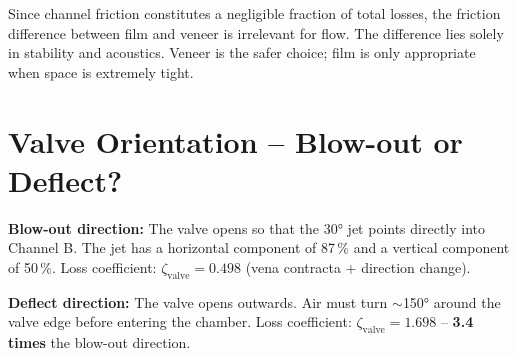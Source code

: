 \documentclass[11pt,a4paper]{article}
\begin{document}
\begin{table}[H]
\centering\small
{}
\caption{Film vs.\ veneer as dividing wall material}
\end{table}

Since channel friction constitutes a negligible fraction of total losses, the friction difference between film and veneer is irrelevant for flow. The difference lies solely in stability and acoustics. Veneer is the safer choice; film is only appropriate when space is extremely tight.

\section{Valve Orientation -- Blow-out or Deflect?}

\textbf{Blow-out direction:} The valve opens so that the 30° jet points directly into Channel B. The jet has a horizontal component of 87\,\% and a vertical component of 50\,\%. Loss coefficient: $\zeta_\text{valve} = 0.498$ (vena contracta + direction change).

\textbf{Deflect direction:} The valve opens outwards. Air must turn $\sim$150° around the valve edge before entering the chamber. Loss coefficient: $\zeta_\text{valve} = 1.698$ -- \textbf{3.4 times} the blow-out direction.

\begin{table}[H]
\centering\small
{}
\caption{Blow-out vs.\ deflect valve orientation comparison}
\end{table}
\end{document}
